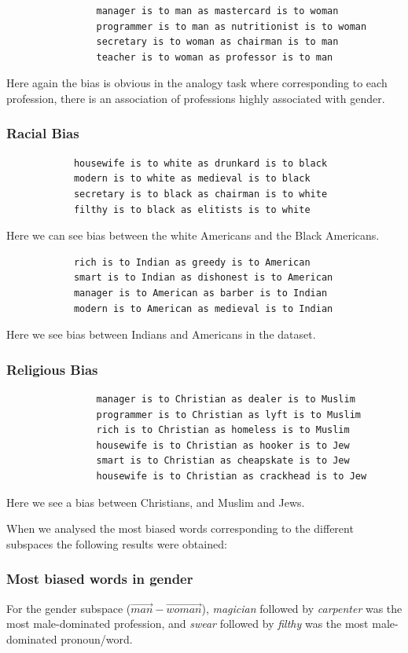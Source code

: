 \documentclass[12pt, a4paper]{article}
\begin{document}
				\begin{verbatim}
				manager is to man as mastercard is to woman
				programmer is to man as nutritionist is to woman
				secretary is to woman as chairman is to man
				teacher is to woman as professor is to man
				\end{verbatim}
				Here again the bias is obvious in the analogy task where corresponding to each profession, there is an association of professions highly associated with gender.
				
			\subsubsection{Racial Bias}
			\begin{verbatim}
			housewife is to white as drunkard is to black
			modern is to white as medieval is to black
			secretary is to black as chairman is to white
			filthy is to black as elitists is to white
			\end{verbatim}
			Here we can see bias between the white Americans and the Black Americans.
			
			\begin{verbatim}
			rich is to Indian as greedy is to American
			smart is to Indian as dishonest is to American
			manager is to American as barber is to Indian
			modern is to American as medieval is to Indian
			\end{verbatim}
			Here we see bias between Indians and Americans in the dataset.
			
			\subsubsection{Religious Bias}
				\begin{verbatim}
				manager is to Christian as dealer is to Muslim
				programmer is to Christian as lyft is to Muslim
				rich is to Christian as homeless is to Muslim
				housewife is to Christian as hooker is to Jew
				smart is to Christian as cheapskate is to Jew
				housewife is to Christian as crackhead is to Jew
				\end{verbatim}
			Here we see a bias between Christians, and Muslim and Jews. 
			\vspace{5mm}
			\par When we analysed the most biased words corresponding to the different subspaces the following results were obtained:
			
			\subsubsection{Most biased words in gender}
				For the gender subspace ($ \vec{man} - \vec{woman}$), \emph{magician} followed by \emph{carpenter} was the most male-dominated profession, and \emph{swear} followed by \emph{filthy} was the most male-dominated pronoun/word.
				
\end{document}
